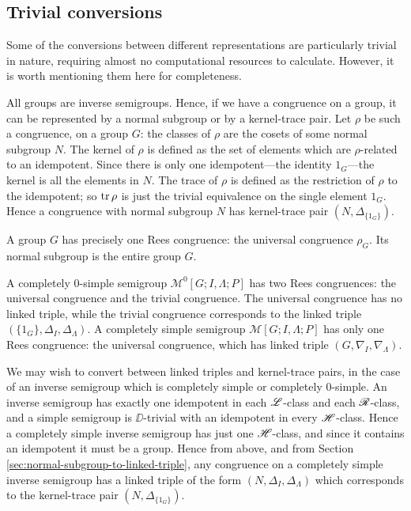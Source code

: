 \subsection{Trivial conversions}
\label{sec:trivial-conversions}
Some of the conversions between different representations are particularly
trivial in nature, requiring almost no computational resources to calculate.
However, it is worth mentioning them here for completeness.

All groups are inverse semigroups.  Hence, if we have a congruence on a group,
it can be represented by a normal subgroup or by a kernel-trace pair.  Let
$\rho$ be such a congruence, on a group $G$: the classes of $\rho$ are the
cosets of some normal subgroup $N$.  The kernel of $\rho$ is defined as the set
of elements which are $\rho$-related to an idempotent.  Since there is only one
idempotent---the identity $1_G$---the kernel is all the elements in $N$.  The
trace of $\rho$ is defined as the restriction of $\rho$ to the idempotent; so
$\operatorname{tr}\rho$ is just the trivial equivalence on the single element $1_G$.  Hence a
congruence with normal subgroup $N$ has kernel-trace pair
$(N, \Delta_{\{1_G\}})$.

A group $G$ has precisely one Rees congruence: the universal congruence
$\rho_G$.  Its normal subgroup is the entire group $G$.

A completely 0-simple semigroup $\mathcal{M}^0[G;I,\Lambda;P]$ has two Rees
congruences: the universal congruence and the trivial congruence.  The universal
congruence has no linked triple, while the trivial congruence corresponds to the
linked triple $(\{1_G\}, \Delta_I, \Delta_\Lambda)$.  A completely simple
semigroup $\mathcal{M}[G;I,\Lambda;P]$ has only one Rees congruence: the
universal congruence, which has linked triple $(G, \nabla_I, \nabla_\Lambda)$.

We may wish to convert between linked triples and kernel-trace pairs, in the
case of an inverse semigroup which is completely simple or completely 0-simple.
An inverse semigroup has exactly one idempotent in each $\mathrel{\mathscr{L}}$-class and each
$\mathrel{\mathscr{R}}$-class, and a simple semigroup is $\DD$-trivial with an idempotent in every
$\mathrel{\mathscr{H}}$-class.  Hence a completely simple inverse semigroup has just one $\mathrel{\mathscr{H}}$-class, and
since it contains an idempotent it must be a group.  Hence from above, and from
Section \ref{sec:normal-subgroup-to-linked-triple}, any congruence on a
completely simple inverse semigroup has a linked triple of the form
$(N, \Delta_I, \Delta_\Lambda)$ which corresponds to the kernel-trace pair
$(N, \Delta_{\{1_G\}})$.

